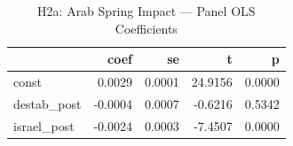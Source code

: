 \begin{table}
\caption{H2a: Arab Spring Impact — Panel OLS Coefficients}
\label{tab:h2a_regression}
\begin{tabular}{lrrrr}
\toprule
 & coef & se & t & p \\
\midrule
const & 0.0029 & 0.0001 & 24.9156 & 0.0000 \\
destab\_post & -0.0004 & 0.0007 & -0.6216 & 0.5342 \\
israel\_post & -0.0024 & 0.0003 & -7.4507 & 0.0000 \\
\bottomrule
\end{tabular}
\end{table}
